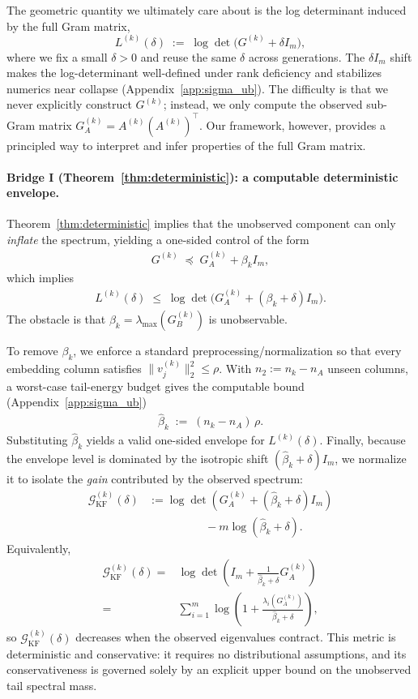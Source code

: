 \documentclass{article}
\theoremstyle{plain}
\theoremstyle{definition}
\theoremstyle{remark}
\begin{document}
The geometric quantity we ultimately care about is the log determinant induced by the full Gram matrix,
\[
L^{(k)}(\delta)\;:=\;\log\det\!\big(G^{(k)}+\delta I_m\big),
\]
where we fix a small $\delta>0$ and reuse the same $\delta$ across generations.
The $\delta I_m$ shift makes the log-determinant well-defined under rank deficiency and stabilizes
numerics near collapse (Appendix~\ref{app:sigma_ub}). The difficulty is that we never explicitly construct \(G^{(k)}\); instead, we only compute the observed sub-Gram matrix \(G_A^{(k)} = A^{(k)}(A^{(k)})^\top\). Our framework, however, provides a principled way to interpret and infer properties of the full Gram matrix.

\paragraph{Bridge I (Theorem~\ref{thm:deterministic}): a computable deterministic envelope.}
Theorem~\ref{thm:deterministic} implies that the unobserved component
can only \emph{inflate} the spectrum, yielding a one-sided control of the form
\begin{align}
G^{(k)} \;\preceq\; G_A^{(k)}+\beta_k I_m,
\end{align}
which implies
\begin{align}
L^{(k)}(\delta)\;\le\;\log\det\!\big(G_A^{(k)}+(\beta_k+\delta)I_m\big).
\end{align}
The obstacle is that $\beta_k=\lambda_{\max}(G_B^{(k)})$ is unobservable.

To remove $\beta_k$, we enforce a standard preprocessing/normalization so that every embedding column
satisfies $\|v_j^{(k)}\|_2^2\le \rho$. With $n_2:=n_k-n_A$ unseen columns, a worst-case tail-energy budget gives
the computable bound (Appendix~\ref{app:sigma_ub})
\begin{align}
\widehat{\beta}_k \;:=\; (n_k-n_A)\,\rho .
\label{eq:betahat_rho}
\end{align}
Substituting $\widehat{\beta}_k$ yields a valid one-sided envelope for $L^{(k)}(\delta)$. Finally, because the envelope level is dominated by the isotropic shift $(\widehat{\beta}_k+\delta)I_m$,
we normalize it to isolate the \emph{gain} contributed by the observed spectrum:
\begin{align}
\mathcal{G}_{\mathrm{KF}}^{(k)}(\delta)
&:= \log\det\!\left(G_A^{(k)}+(\widehat{\beta}_k+\delta)I_m\right)
\nonumber\\[-1mm]
&\qquad \quad \qquad- m\log(\widehat{\beta}_k+\delta).
\label{eq:metric_kf_gain}
\end{align}
Equivalently,
\begin{align}
\mathcal{G}_{\mathrm{KF}}^{(k)}(\delta)
=&\log\det\!\left(I_m+\frac{1}{\widehat{\beta}_k+\delta}G_A^{(k)}\right) \nonumber \\
=&\sum_{i=1}^m \log\!\left(1+\frac{\lambda_i(G_A^{(k)})}{\widehat{\beta}_k+\delta}\right),
\end{align}
so $\mathcal{G}_{\mathrm{KF}}^{(k)}(\delta)$ decreases when the observed eigenvalues contract.
This metric is deterministic and conservative: it requires no distributional assumptions, and its conservativeness is governed solely by an explicit upper bound on the unobserved tail spectral mass.
\end{document}
